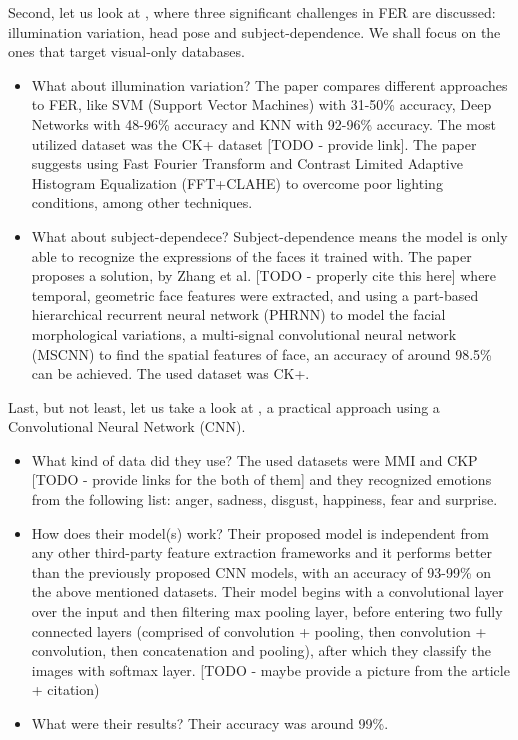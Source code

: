 \documentclass[runningheads,a4paper,11pt]{report}
\begin{document}
Second, let us look at \cite{Samadiani19}, where three significant challenges in FER are discussed: illumination variation, head pose and subject-dependence. We shall focus on the ones that target visual-only databases.
\begin{itemize}
	\item What about illumination variation? The paper compares different approaches to FER, like SVM (Support Vector Machines) with 31-50\% accuracy, Deep Networks with 48-96\% accuracy and KNN with 92-96\% accuracy. The most utilized dataset was the CK+ dataset [TODO - provide link]. The paper suggests using Fast Fourier Transform and Contrast Limited Adaptive Histogram Equalization (FFT+CLAHE) to overcome poor lighting conditions, among other techniques.
	\item What about subject-dependece? Subject-dependence means the model is only able to recognize the expressions of the faces it trained with. The paper proposes a solution, by Zhang et al. [TODO - properly cite this here] where temporal, geometric face features were extracted, and using a part-based hierarchical recurrent neural network (PHRNN) to model the facial morphological variations, a multi-signal convolutional neural network (MSCNN) to find the spatial features of face, an accuracy of around 98.5\% can be achieved. The used dataset was CK+.
\end{itemize}

Last, but not least, let us take a look at \cite{Burkert16}, a practical approach using a Convolutional Neural Network (CNN).
\begin{itemize}
	\item What kind of data did they use? The used datasets were MMI and CKP [TODO - provide links for the both of them] and they recognized emotions from the following list: anger, sadness, disgust, happiness, fear and surprise.
	\item How does their model(s) work? Their proposed model is independent from any other third-party feature extraction frameworks and it performs better than the previously proposed CNN models, with an accuracy of 93-99\% on the above mentioned datasets. Their model begins with a convolutional layer over the input and then filtering max pooling layer, before entering two fully connected layers (comprised of convolution + pooling, then convolution + convolution, then concatenation and pooling), after which they classify the images with softmax layer. [TODO - maybe provide a picture from the article + citation)
	\item What were their results? Their accuracy was around 99\%.
\end{itemize}
\end{document}

